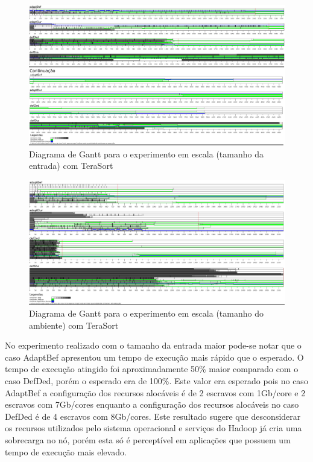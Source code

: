 \begin{figure}
    \centering
	\includegraphics[width=1\textwidth]{figuras/TS-esc-ent-cut.png}
    \caption{Diagrama de Gantt para o experimento em escala (tamanho da entrada) com TeraSort}
	\label{fig:exp3TS}
\end{figure}

\begin{figure}
	\includegraphics[width=1\textwidth]{figuras/TS-esc-amb.png}
    \caption{Diagrama de Gantt para o experimento em escala (tamanho do ambiente) com TeraSort}
	\label{fig:exp31TS}	
\end{figure}

No experimento realizado com o tamanho da entrada maior pode-se notar que o caso AdaptBef apresentou um tempo de execução mais rápido que o esperado. O tempo de execução atingido foi aproximadamente 50\% maior comparado com o caso DefDed, porém o esperado era de 100\%. Este valor era esperado pois no caso AdaptBef a configuração dos recursos alocáveis é de 2 escravos com 1Gb/core e 2 escravos com 7Gb/cores enquanto a configuração dos recursos alocáveis no caso DefDed é de 4 escravos com 8Gb/cores. Este resultado sugere que desconsiderar os recursos utilizados pelo sistema operacional e serviços do Hadoop já cria uma sobrecarga no nó, porém esta só é perceptível em aplicações que possuem um tempo de execução mais elevado. 

